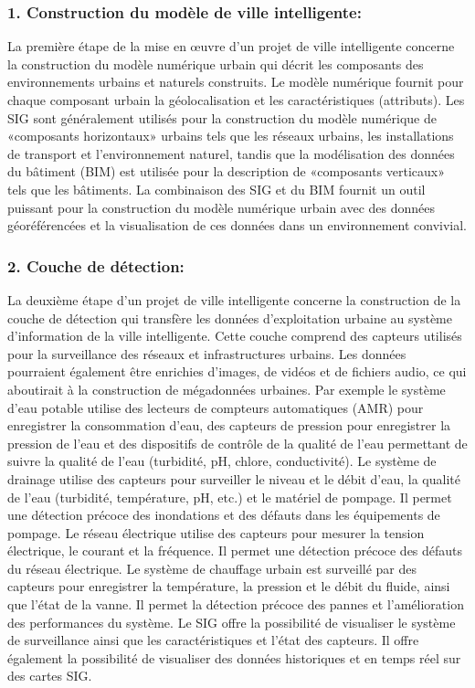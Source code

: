 \documentclass[french, a4paper, 12pt]{report}
\begin{document}
\subsubsection{1. Construction du modèle de ville intelligente:}
La première étape de la mise en œuvre d’un projet de ville intelligente concerne la construction du modèle numérique urbain qui décrit les composants des environnements urbains et naturels construits. Le modèle numérique fournit pour chaque composant urbain la géolocalisation et les caractéristiques (attributs). Les SIG sont généralement utilisés pour la construction du modèle numérique de «composants horizontaux» urbains tels que les réseaux urbains, les installations de transport et l’environnement naturel, tandis que la modélisation des données du bâtiment (BIM) est utilisée pour la description de «composants verticaux» tels que les bâtiments. La combinaison des SIG et du BIM fournit un outil puissant pour la construction du modèle numérique urbain avec des données géoréférencées et la visualisation de ces données dans un environnement convivial.

\subsubsection{2. Couche de détection:}
La deuxième étape d’un projet de ville intelligente concerne la construction de la couche de détection qui transfère les données d’exploitation urbaine au système d’information de la ville intelligente. Cette couche comprend des capteurs utilisés pour la surveillance des réseaux et infrastructures urbains. Les données pourraient également être enrichies d'images, de vidéos et de fichiers audio, ce qui aboutirait à la construction de mégadonnées urbaines. Par exemple le système d'eau potable utilise des lecteurs de compteurs automatiques (AMR) pour enregistrer la consommation d'eau, des capteurs de pression pour enregistrer la pression de l'eau et des dispositifs de contrôle de la qualité de l'eau permettant de suivre la qualité de l'eau (turbidité, pH, chlore, conductivité). Le système de drainage utilise des capteurs pour surveiller le niveau et le débit d'eau, la qualité de l'eau (turbidité, température, pH, etc.) et le matériel de pompage. Il permet une détection précoce des inondations et des défauts dans les équipements de pompage. Le réseau électrique utilise des capteurs pour mesurer la tension électrique, le courant et la fréquence. Il permet une détection précoce des défauts du réseau électrique. Le système de chauffage urbain est surveillé par des capteurs pour enregistrer la température, la pression et le débit du fluide, ainsi que l'état de la vanne. Il permet la détection précoce des pannes et l'amélioration des performances du système. Le SIG offre la possibilité de visualiser le système de surveillance ainsi que les caractéristiques et l’état des capteurs. Il offre également la possibilité de visualiser des données historiques et en temps réel sur des cartes SIG.
\end{document}

